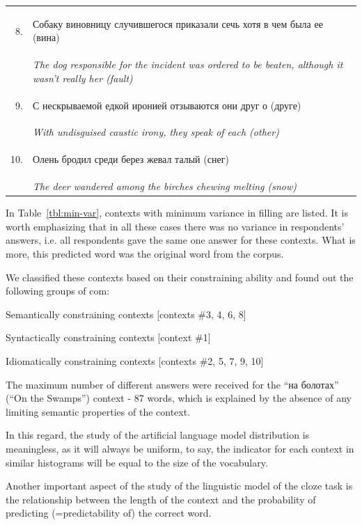 \documentclass[a4paper]{article}
\begin{document}
\begin{table}
\begin{tabular}{rl}
8. & \begin{russian} Собаку виновницу случившегося приказали сечь хотя в чем была ее (вина)\end{russian} \\
& \textit{ The dog responsible for the incident was ordered to be beaten, although it wasn't really her (fault) } \\
9. & \begin{russian} С нескрываемой едкой иронией отзываются они друг о (друге)\end{russian} \\
& \textit{ With undisguised caustic irony, they speak of each (other) } \\
10. & \begin{russian} Олень бродил среди берез жевал талый (снег)\end{russian} \\
& \textit{ The deer wandered among the birches chewing melting (snow) } \\
\end{tabular}
\end{table}

In Table~\ref{tbl:min-var}, contexts with minimum variance in filling are listed. It is worth emphasizing that in all these cases there was no variance in respondents’ answers, i.e. all respondents gave the same one answer for these contexts. What is more, this predicted word was the original word from the corpus.

We classified these contexts based on their constraining ability and found out the following groups of com:
\newline

Semantically constraining contexts [contexts \#3, 4, 6, 8]

Syntactically constraining contexts [context \#1]

Idiomatically constraining contexts [contexts \#2, 5, 7, 9, 10]
\newline

The maximum number of different answers were received for the “на болотах” (“On the Swamps”) context - 87 words, which is explained by the absence of any limiting semantic properties of the context.

In this regard, the study of the artificial language model distribution is meaningless, as it will always be uniform, to say, the indicator for each context in similar histograms will be equal to the size of the vocabulary.

Another important aspect of the study of the linguistic model of the cloze task is the relationship between the length of the context and the probability of predicting (=predictability of) the correct word.
\end{document}
